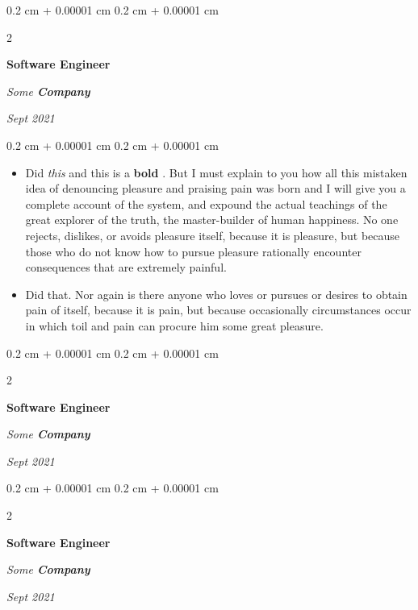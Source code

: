\documentclass[10pt, letterpaper]{article}
\newenvironment{highlights}{
    \begin{itemize}[
        topsep=0.10 cm,
        parsep=0.10 cm,
        partopsep=0pt,
        itemsep=0pt,
        leftmargin=0.4 cm + 10pt
    ]
}{
    \end{itemize}
} %
\newenvironment{onecolentry}{
    \begin{adjustwidth}{
        0.2 cm + 0.00001 cm
    }{
        0.2 cm + 0.00001 cm
    }
}{
    \end{adjustwidth}
} %
\newenvironment{twocolentry}[2][]{
    \onecolentry
    \def\secondColumn{#2}
    \setcolumnwidth{\fill, 4.5 cm}
    \begin{paracol}{2}
}{
    \switchcolumn \raggedleft \secondColumn
    \end{paracol}
    \endonecolentry
} %
\let\hrefWithoutArrow\href
\renewcommand{\href}[2]{\hrefWithoutArrow{#1}{\ifthenelse{\equal{#2}{}}{ }{#2 }\raisebox{.15ex}{\footnotesize \faExternalLink*}}}
\begin{document}
        \vspace{0.2 cm}

        \begin{twocolentry}{
            
            
        \textit{Sept 2021}}
            \textbf{Software Engineer}
            
            \textit{Some \textbf{Company}}
        \end{twocolentry}

        \vspace{0.10 cm}
        \begin{onecolentry}
            \begin{highlights}
                \item Did \textit{this} and this is a \textbf{bold} \href{https://example.com}{link}. But I must explain to you how all this mistaken idea of denouncing pleasure and praising pain was born and I will give you a complete account of the system, and expound the actual teachings of the great explorer of the truth, the master-builder of human happiness. No one rejects, dislikes, or avoids pleasure itself, because it is pleasure, but because those who do not know how to pursue pleasure rationally encounter consequences that are extremely painful.
                \item Did that. Nor again is there anyone who loves or pursues or desires to obtain pain of itself, because it is pain, but because occasionally circumstances occur in which toil and pain can procure him some great pleasure.
            \end{highlights}
        \end{onecolentry}


        \vspace{0.2 cm}

        \begin{twocolentry}{
            
            
        \textit{Sept 2021}}
            \textbf{Software Engineer}
            
            \textit{Some \textbf{Company}}
        \end{twocolentry}



        \vspace{0.2 cm}

        \begin{twocolentry}{
            
            
        \textit{Sept 2021}}
            \textbf{Software Engineer}
            
            \textit{Some \textbf{Company}}
        \end{twocolentry}
\end{document}
